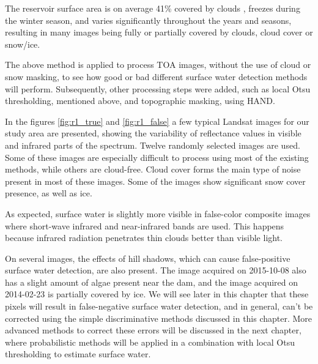 The reservoir surface area is on average 41\% covered by clouds \cite{wilson2016remotely}, freezes during the winter season, and varies significantly throughout the years and seasons, resulting in many images being fully or partially covered by clouds, cloud cover or snow/ice.

The above method is applied to process TOA images, without the use of cloud or snow masking, to see how good or bad different surface water detection methods will perform. Subsequently, other processing steps were added, such as local Otsu thresholding, mentioned above, and topographic masking, using \gls{HAND}. 


In the figures \ref{fig:r1_true} and \ref{fig:r1_false} a few typical Landsat images for our study area are presented, showing the variability of reflectance values in visible and infrared parts of the spectrum. Twelve randomly selected images are used. Some of these images are especially difficult to process using most of the existing methods, while others are cloud-free. Cloud cover forms the main type of noise present in most of these images. Some of the images show significant snow cover presence, as well as ice. 

As expected, surface water is slightly more visible in false-color composite images where short-wave infrared and near-infrared bands are used. This happens because infrared radiation penetrates thin clouds better than visible light. 

On several images, the effects of hill shadows, which can cause false-positive surface water detection, are also present. The image acquired on 2015-10-08 also has a slight amount of algae present near the dam, and the image acquired on 2014-02-23 is partially covered by ice. We will see later in this chapter that these pixels will result in false-negative surface water detection, and in general, can't be corrected using the simple discriminative methods discussed in this chapter. More advanced methods to correct these errors will be discussed in the next chapter, where probabilistic methods will be applied in a combination with local Otsu thresholding to estimate surface water.


